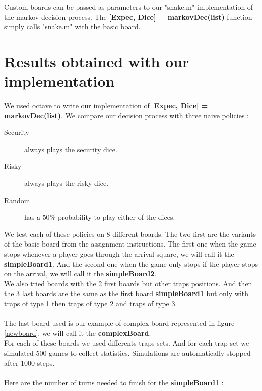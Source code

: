 \documentclass{eplDoc}
\begin{document}
Custom boards can be passed as parameters to our "snake.m" implementation of the markov decision process. The \textbf{[Expec, Dice] = markovDec(list)} function simply calls "snake.m" with the basic board. 

\section{Results obtained with our implementation}

We used octave to write our implementation of \textbf{[Expec, Dice] = markovDec(list)}. We compare our decision process with three naive policies :
 
\begin{description}
	\item[Security] always plays the security dice.
	\item[Risky] always plays the risky dice.
	\item[Random] has a $50\%$ probability to play either of the dices.
\end{description}
 
We test each of these policies on 8 different boards. The two first are the variants of the basic board from the assignment instructions. The first one when the game stops whenever a player goes through the arrival square, we will call it the \textbf{simpleBoard1}. And the second one when the game only stops if the player stops on the arrival, we will call it the \textbf{simpleBoard2}. \\ 
We also tried boards with the 2 first boards but other traps positions.  And then the 3 last boards are the same as the first board \textbf{simpleBoard1} but only with traps of type 1 then traps of type 2 and traps of type 3.\\\\
The last board used is our example of complex board represented in figure \ref{newboard}, we will call it the \textbf{complexBoard}. \\ 
For each of these boards we used differents traps sets. And for each trap set we simulated 500 games to collect statistics. Simulations are automatically stopped after 1000 steps. \\ \\ 

Here are the number of turns needed to finish for the \textbf{simpleBoard1} : 
\end{document}
